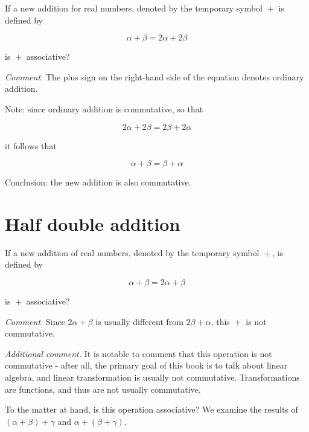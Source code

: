 \begin{problem}
If a new addition for real numbers, denoted by the temporary symbol $\boxed{+}$ is defined by

\begin{equation}
    \alpha \boxed{+} \beta = 2\alpha + 2\beta
\end{equation}

is $\boxed{+}$ associative?
\end{problem}

\textit{Comment.} The plus sign on the right-hand side of the equation denotes ordinary addition.

Note: since ordinary addition is commutative, so that

\begin{equation}
    2\alpha + 2\beta = 2\beta + 2\alpha
\end{equation}

it follows that

\begin{equation}
    \alpha \boxed{+} \beta = \beta \boxed{+} \alpha
\end{equation}

Conclusion: the new addition is also commutative.

\section{Half double addition}

\begin{problem}
If a new addition of real numbers, denoted by the temporary symbol $\boxed{+}$, is defined by

\begin{equation}
    \alpha \boxed{+} \beta = 2\alpha + \beta
\end{equation}

is $\boxed{+}$ associative?
\end{problem}

\textit{Comment.} Since $2\alpha + \beta$ is usually different from $2\beta + \alpha$, this $\boxed{+}$ is not commutative.

\textit{Additional comment.} It is notable to comment that this operation is not commutative - after all, the primary goal of this book is to talk about linear algebra, and linear transformation is usually not commutative. Transformations are functions, and thus are not usually commutative.

To the matter at hand, is this operation associative? We examine the results of $(\alpha \boxed{+} \beta) \boxed{+} \gamma$ and $\alpha \boxed{+} (\beta \boxed{+} \gamma)$.

